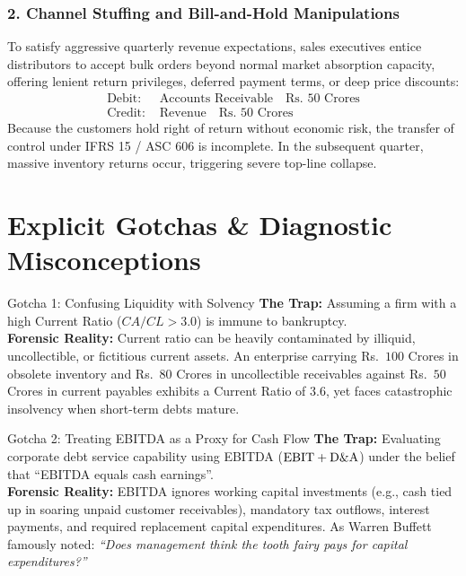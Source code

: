 \subsubsection{2. Channel Stuffing and Bill-and-Hold Manipulations}
To satisfy aggressive quarterly revenue expectations, sales executives entice distributors to accept bulk orders beyond normal market absorption capacity, offering lenient return privileges, deferred payment terms, or deep price discounts:
\begin{align*}
\text{Debit: } & \text{Accounts Receivable} \quad \text{Rs.~50 Crores} \\
\text{Credit: } & \text{Revenue} \quad \text{Rs.~50 Crores}
\end{align*}
Because the customers hold right of return without economic risk, the transfer of control under IFRS 15 / ASC 606 is incomplete. In the subsequent quarter, massive inventory returns occur, triggering severe top-line collapse.

\section{Explicit Gotchas \& Diagnostic Misconceptions}

\begin{trapbox}{Gotcha 1: Confusing Liquidity with Solvency}
\textbf{The Trap:} Assuming a firm with a high Current Ratio ($CA/CL > 3.0$) is immune to bankruptcy.\\
\textbf{Forensic Reality:} Current ratio can be heavily contaminated by illiquid, uncollectible, or fictitious current assets. An enterprise carrying Rs.~$100$ Crores in obsolete inventory and Rs.~$80$ Crores in uncollectible receivables against Rs.~$50$ Crores in current payables exhibits a Current Ratio of $3.6$, yet faces catastrophic insolvency when short-term debts mature.
\end{trapbox}

\begin{trapbox}{Gotcha 2: Treating EBITDA as a Proxy for Cash Flow}
\textbf{The Trap:} Evaluating corporate debt service capability using EBITDA ($\text{EBIT} + \text{D\&A}$) under the belief that ``EBITDA equals cash earnings''.\\
\textbf{Forensic Reality:} EBITDA ignores working capital investments (e.g., cash tied up in soaring unpaid customer receivables), mandatory tax outflows, interest payments, and required replacement capital expenditures. As Warren Buffett famously noted: \textit{``Does management think the tooth fairy pays for capital expenditures?''}
\end{trapbox}

